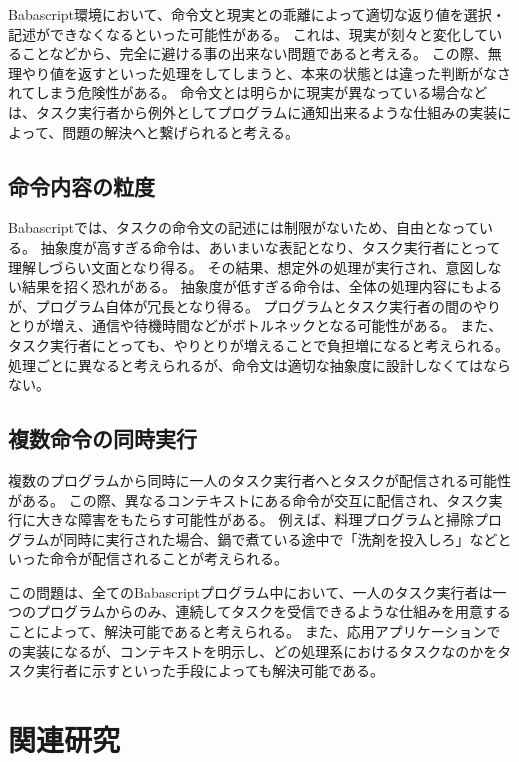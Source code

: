 Babascript環境において、命令文と現実との乖離によって適切な返り値を選択・記述ができなくなるといった可能性がある。
これは、現実が刻々と変化していることなどから、完全に避ける事の出来ない問題であると考える。
この際、無理やり値を返すといった処理をしてしまうと、本来の状態とは違った判断がなされてしまう危険性がある。
命令文とは明らかに現実が異なっている場合などは、タスク実行者から例外としてプログラムに通知出来るような仕組みの実装によって、問題の解決へと繋げられると考える。

\subsection{命令内容の粒度}\label{ux547dux4ee4ux5185ux5bb9ux306eux7c92ux5ea6}

Babascriptでは、タスクの命令文の記述には制限がないため、自由となっている。
抽象度が高すぎる命令は、あいまいな表記となり、タスク実行者にとって理解しづらい文面となり得る。
その結果、想定外の処理が実行され、意図しない結果を招く恐れがある。
抽象度が低すぎる命令は、全体の処理内容にもよるが、プログラム自体が冗長となり得る。
プログラムとタスク実行者の間のやりとりが増え、通信や待機時間などがボトルネックとなる可能性がある。
また、タスク実行者にとっても、やりとりが増えることで負担増になると考えられる。
処理ごとに異なると考えられるが、命令文は適切な抽象度に設計しなくてはならない。

\subsection{複数命令の同時実行}\label{ux8907ux6570ux547dux4ee4ux306eux540cux6642ux5b9fux884c}

複数のプログラムから同時に一人のタスク実行者へとタスクが配信される可能性がある。
この際、異なるコンテキストにある命令が交互に配信され、タスク実行に大きな障害をもたらす可能性がある。
例えば、料理プログラムと掃除プログラムが同時に実行された場合、鍋で煮ている途中で「洗剤を投入しろ」などといった命令が配信されることが考えられる。

この問題は、全てのBabascriptプログラム中において、一人のタスク実行者は一つのプログラムからのみ、連続してタスクを受信できるような仕組みを用意することによって、解決可能であると考えられる。
また、応用アプリケーションでの実装になるが、コンテキストを明示し、どの処理系におけるタスクなのかをタスク実行者に示すといった手段によっても解決可能である。

\section{関連研究}\label{ux95a2ux9023ux7814ux7a76}

